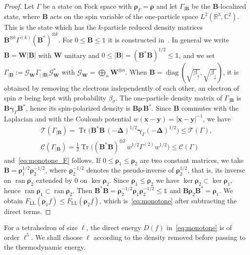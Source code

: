 \documentclass[final,reqno]{amsart}
\theoremstyle{remark}
\renewcommand{\le}{\leqslant}
\newcommand{\spu}{\uparrow}
\newcommand{\spd}{\downarrow}
\DeclareMathOperator{\diag}{diag}
\DeclareMathOperator{\ran}{ran}
\DeclareMathOperator{\Tr}{Tr}
\newcommand{\RR}{\mathbb{R}}
\newcommand{\CC}{\mathbb{C}}
\newcommand{\LL}{\mathrm{LL}}
\newcommand{\iden}{\mathbb{1}}
\newcommand{\lapl}{\bm{\Delta}}
\newcommand{\TC}{\mathcal{T}}
\newcommand{\Cc}{\mathcal{C}}
\newcommand{\GC}{\mathcal{G}}
\begin{document}
\begin{proof}
Let $\Gamma$ be a state on Fock space with $\bm{\rho}_\Gamma=\bm{\rho}$ and let $\Gamma_{|\mathbf{B}}$ be the $\mathbf{B}$-localized state, where $\mathbf{B}$ acts on the spin variable of the one-particle space $L^2(\RR^3,\CC^2)$. This is the state which has the $k$-particle reduced density matrices $\mathbf{B}^{\otimes k}\Gamma^{(k)}(\mathbf{B}^*)^{\otimes k}$. For $0\le\mathbf{B}\le\iden$ it is constructed in~\cite{lewin2011geometric}. In general we write $\mathbf{B}=\mathbf{W}|\mathbf{B}|$ with $\mathbf{W}$ unitary and $0\le|\mathbf{B}|=(\mathbf{B}^*\mathbf{B})^{1/2}\le\iden$, and we set $\Gamma_{|\mathbf{B}}:=\GC_{\mathbf{W}}\Gamma_{|\,|\mathbf{B}|}\GC_{\mathbf{W}}^*$ with $\GC_{\mathbf{W}}=\bigoplus_n\mathbf{W}^{\otimes n}$. When $\mathbf{B}=\diag(\sqrt{\beta_\spu},\sqrt{\beta_\spd})$, it is obtained by removing the electrons independently of each other, an electron of spin $\sigma$ being kept with probability $\beta_\sigma$. The one-particle density matrix of $\Gamma_{|\mathbf{B}}$ is $\mathbf{B}\bm{\gamma}_\Gamma \mathbf{B}^*$, hence its spin-polarized density is $\mathbf{B}\bm{\rho}\,\mathbf{B}^*$. Since $\mathbf{B}$ commutes with the Laplacian and with the Coulomb potential $w(\mathbf{x}-\mathbf{y})=|\mathbf{x}-\mathbf{y}|^{-1}$, we have
\begin{gather*}
\TC(\Gamma_{|\mathbf{B}})=\Tr\Big(\mathbf{B}^*\mathbf{B}\,(-\lapl)^{1/2}\bm{\gamma}_\Gamma(-\lapl)^{1/2}\Big)\le\TC(\Gamma),\\
\Cc(\Gamma_{|\mathbf{B}})=\frac12\Tr\Big((\mathbf{B}^*\mathbf{B})^{\otimes 2}\,w^{1/2}\Gamma^{(2)}w^{1/2}\Big)\le\Cc(\Gamma)
\end{gather*}
and~\cref{eq:monotone_F} follows. If $0\le \bm{\rho}_1\le \bm{\rho}_2$ are two constant matrices, we take $\mathbf{B}=\bm{\rho}_1^{1/2}\bm{\rho}_2^{-1/2}$, where $\bm{\rho}_2^{-1/2}$ denotes the pseudo-inverse of $\bm{\rho}_2^{1/2}$, that is, its inverse on $\ran\bm{\rho}_2$ extended by $0$ on $\ker\bm{\rho}_2$. Since $\bm{\rho}_1\le\bm{\rho}_2$ we have $\ker\bm{\rho}_2\subset\ker\bm{\rho}_1$, hence $\ran\bm{\rho}_1\subset\ran\bm{\rho}_2$. Then $\mathbf{B}^*\mathbf{B}=\bm{\rho}_2^{-1/2}\bm{\rho}_1\bm{\rho}_2^{-1/2}\le \iden$ and $\mathbf{B}\bm{\rho}_2\mathbf{B}^*=\bm{\rho}_1$. We obtain $F_\LL(\bm{\rho}_1f)\le F_\LL(\bm{\rho}_2f)$, which is~\cref{eq:monotone} after subtracting the direct terms.
\end{proof}

For a tetrahedron of size $\ell$, the direct energy $D(f)$ in~\cref{eq:monotone} is of order $\ell^5$. We shall choose $\ell$ according to the density removed before passing to the thermodynamic energy.
\end{document}
